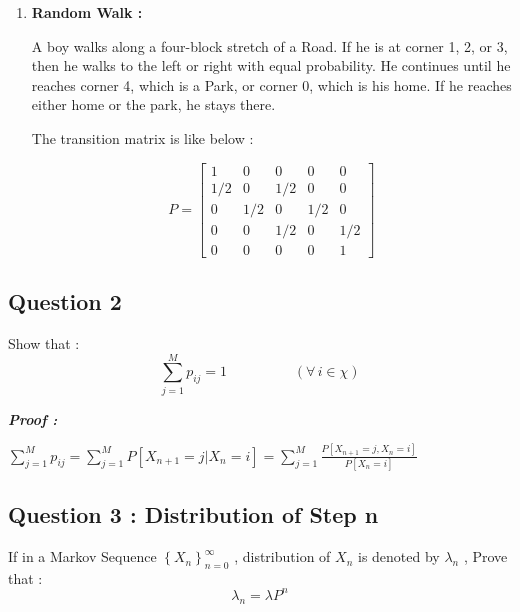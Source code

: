 \documentclass[a4paper]{article}
\begin{document}
\begin{enumerate}
				\item{\textbf{Random Walk :}}
				
					A boy walks along a four-block stretch of a Road. If he is at corner 1, 2,
					or 3, then he walks to the left or right with equal probability. He continues until he
					reaches corner 4, which is a Park, or corner 0, which is his home. If he reaches either
					home or the park, he stays there.

					
					The transition matrix is like below : 
					
					\begin{equation*}
					P = 
					\begin{bmatrix}
					1 & 0 & 0 & 0 & 0     \\
					1/2 & 0 & 1/2 & 0 & 0 \\
					0 & 1/2 & 0 & 1/2 & 0 \\
					0 & 0 & 1/2 & 0 & 1/2 \\
					0 & 0 & 0 & 0 & 1
					\end{bmatrix}
					\end{equation*}
				
			\end{enumerate}
			
			
		\vspace{2\baselineskip}
		\subsection{{\Large Question 2}}
			\hspace{\parindent} \large Show that : 
			{$$\displaystyle{\sum_{j=1}^{M} p_{ij} = 1} \hspace{2cm} {\left(\forall\, i \in \chi \right)} $$} 

			\large{\bf \emph{Proof :}}
			\vspace{.8cm}
			
			{$\displaystyle{\sum_{j=1}^{M} p_{ij} = \sum_{j=1}^{M} P[X_{n+1} = j | X_{n} = i]} = \sum_{j=1}^{M} \frac{P[X_{n+1} = j , X_{n} = i]}{P[X_{n} = i]} $}\\
			\vspace{.5cm}
			
				
		\subsection{{\Large Question 3 :} Distribution of Step n }
		\hspace{\parindent} If in a Markov Sequence {$\left\{X_{n}\right\}_{n=0}^{\infty}$} , 
		distribution of $X_{n}$ is denoted by $\lambda_{n}$ , Prove that :\[\lambda_{n} = \lambda P^n\]
\end{document}
